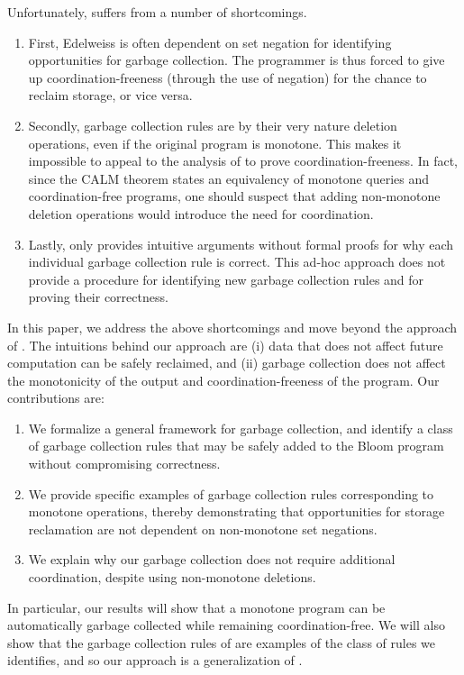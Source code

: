 Unfortunately, \cite{conway2014edelweiss} suffers from a number of shortcomings.
\begin{enumerate}
\item First, Edelweiss is often dependent on set negation for identifying opportunities for garbage collection.
The programmer is thus forced to give up coordination-freeness (through the use of negation) for the chance to reclaim storage, or vice versa.
\item Secondly, garbage collection rules are by their very nature deletion operations, even if the original program is monotone.
This makes it impossible to appeal to the analysis of \cite{marczak2012confluence} to prove coordination-freeness.
In fact, since the CALM theorem states an equivalency of monotone queries and coordination-free programs, one should suspect that adding non-monotone deletion operations would introduce the need for coordination.
\item Lastly, \cite{conway2014edelweiss} only provides intuitive arguments without formal proofs for why each individual garbage collection rule is correct.
This ad-hoc approach does not provide a procedure for identifying new garbage collection rules and for proving their correctness.
\end{enumerate}

In this paper, we address the above shortcomings and move beyond the approach of \cite{conway2014edelweiss}.
The intuitions behind our approach are (i) data that does not affect future computation can be safely reclaimed, and (ii) garbage collection does not affect the monotonicity of the output and coordination-freeness of the program.
Our contributions are:
\begin{enumerate}
\item We formalize a general framework for garbage collection, and identify a class of garbage collection rules that may be safely added to the Bloom program without compromising correctness.
\item We provide specific examples of garbage collection rules corresponding to monotone operations, thereby demonstrating that opportunities for storage reclamation are not dependent on non-monotone set negations.
\item We explain why our garbage collection does not require additional coordination, despite using non-monotone deletions.
\end{enumerate}

In particular, our results will show that a monotone program can be automatically garbage collected while remaining coordination-free.
We will also show that the garbage collection rules of \cite{conway2014edelweiss} are examples of the class of rules we identifies, and so our approach is a generalization of \cite{conway2014edelweiss}.





